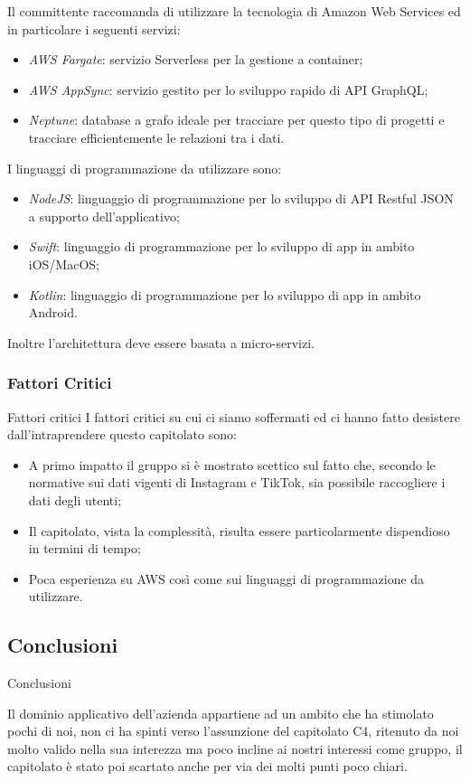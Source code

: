 \documentclass[11pt]{article}
\begin{document}
        Il committente raccomanda di utilizzare la tecnologia di Amazon Web Services ed in particolare i seguenti servizi:
		\begin{itemize}
			\item \textit{AWS Fargate}: servizio Serverless per la gestione a container;
			\item \textit{AWS AppSync}: servizio gestito per lo sviluppo rapido di API GraphQL;
			\item \textit{Neptune}: database a grafo ideale per tracciare per questo tipo di progetti e tracciare efficientemente le relazioni tra i dati.
		\end{itemize}
		I linguaggi di programmazione da utilizzare sono:
		\begin{itemize}
			\item \textit{NodeJS}: linguaggio di programmazione per lo sviluppo di API Restful JSON a supporto dell’applicativo;
			\item \textit{Swift}: linguaggio di programmazione per lo sviluppo di app in ambito iOS/MacOS;
			\item \textit{Kotlin}: linguaggio di programmazione per lo sviluppo di app in ambito Android.
		\end{itemize}
		Inoltre l’architettura deve essere basata a micro-servizi.
    
    \subsubsection{Fattori Critici} Fattori critici
    I fattori critici su cui ci siamo soffermati ed ci hanno fatto desistere dall'intraprendere questo capitolato sono:
    \begin{itemize}
            \item A primo impatto il gruppo si è mostrato scettico sul fatto che, secondo le normative sui dati vigenti di Instagram e TikTok, sia possibile raccogliere i dati degli utenti;
			\item Il capitolato, vista la complessità, risulta essere particolarmente dispendioso in termini di tempo;
			\item Poca esperienza su AWS così come sui linguaggi di programmazione da utilizzare.
        \end{itemize}
    \subsection{Conclusioni} Conclusioni
    
    Il dominio applicativo dell'azienda appartiene ad un ambito che ha stimolato pochi di noi, non ci ha spinti verso l'assunzione del capitolato C4, ritenuto da noi molto valido nella sua interezza ma poco incline ai nostri interessi come gruppo, il capitolato è stato poi scartato anche per via dei molti punti poco chiari.
\end{document}
